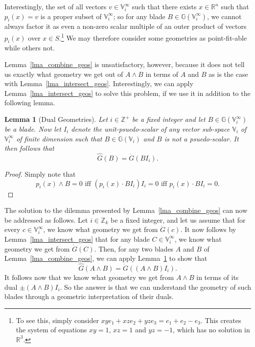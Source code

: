 \documentclass{birkjour}
\newtheorem{lem}[thm]{Lemma}
\theoremstyle{definition}
\theoremstyle{remark}
\numberwithin{equation}{section}
\newcommand{\G}{\mathbb{G}}
\newcommand{\V}{\mathbb{V}}
\newcommand{\R}{\mathbb{R}}
\newcommand{\Z}{\mathbb{Z}}
\newcommand{\Gi}{\dot{G}}
\newcommand{\Go}{\hat{G}}
\begin{document}
Interestingly, the set of all vectors $v\in\V_i^\infty$ such that
there exists $x\in\R^n$ such that $p_i(x)=v$ is a proper subset
of $\V_i^\infty$; so for any blade $B\in\G(\V_i^\infty)$, we cannot always
factor it as even a non-zero scalar multiple of an outer product of vectors $p_i(x)$ over $x\in S$.\footnote{To
see this, simply consider $xy e_1+xz e_2 + yz e_3=e_1+e_2-e_3$.  This
creates the system of equations $xy=1$, $xz=1$ and $yz=-1$, which has
no solution in $\R^3$.}
We may therefore consider some geometries as point-fit-able
while others not.

Lemma~\ref{lma_combine_geos} is unsatisfactory, however, because it does not tell
us exactly what geometry we get out of $A\wedge B$ in terms of $A$ and $B$ as is
the case with Lemma~\ref{lma_intersect_geos}.
Interestingly, we can apply Lemma~\ref{lma_intersect_geos} to solve this
problem, if we use it in addition to the following lemma.
\begin{lem}[Dual Geometries]\label{lma_dual_geos}
Let $i\in\Z^+$ be a fixed integer and let $B\in\G(\V_i^\infty)$
be a blade.  Now let $I_i$ denote the unit-psuedo-scalar of
any vector sub-space $\V_i$ of $\V_i^\infty$ of finite dimension
such that $B\in\G(\V_i)$ and $B$ is not a psuedo-scalar.
It then follows that
\begin{equation}
\Go(B)=\Gi(BI_i).
\end{equation}
\end{lem}
\begin{proof}
Simply note that
\begin{equation}
\mbox{$p_i(x)\wedge B=0$ iff $(p_i(x)\cdot BI_i)I_i=0$ iff $p_i(x)\cdot BI_i=0$.}
\end{equation}
\end{proof}
The solution to the dilemma presented by Lemma~\ref{lma_combine_geos}
can now be addressed as follows.  Let $i\in\Z_k$ be a fixed integer,
and let us assume that for every $c\in\V_i^\infty$, we know what
geometry we get from $\Gi(c)$.  It now follows by Lemma~\ref{lma_intersect_geos}
that for any blade $C\in\V_i^\infty$, we know what geometry we get from $\Gi(C)$.
Then, for any two blades $A$ and $B$ of Lemma~\ref{lma_combine_geos},
we can apply Lemma~\ref{lma_dual_geos} to show that
\begin{equation}
\Go(A\wedge B)=\Gi((A\wedge B)I_i).
\end{equation}
It follows now that we know what geometry we get from $A\wedge B$
in terms of its dual $\pm(A\wedge B)I_i$.  So the answer is that we can understand
the geometry of such blades through a geometric interpretation of their duals.
\end{document}
